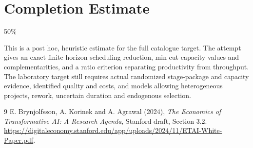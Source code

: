 \documentclass[11pt]{article}
\theoremstyle{definition}
\begin{document}
\section{Completion Estimate}
50\%

This is a post hoc, heuristic estimate for the full catalogue target.
The attempt gives an exact finite-horizon scheduling reduction, min-cut capacity values and complementarities, and a ratio criterion separating productivity from throughput. The laboratory target still requires actual randomized stage-package and capacity evidence, identified quality and costs, and models allowing heterogeneous projects, rework, uncertain duration and endogenous selection.

\begin{thebibliography}{9}
 E. Brynjolfsson, A. Korinek and A. Agrawal (2024), \emph{The Economics of Transformative AI: A Research Agenda}, Stanford draft, Section 3.2. \url{https://digitaleconomy.stanford.edu/app/uploads/2024/11/ETAI-White-Paper.pdf}.
\end{thebibliography}
\end{document}
